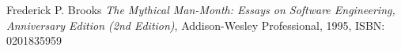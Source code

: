 Frederick P. Brooks {\em The Mythical Man-Month: Essays on Software
                  Engineering, Anniversary Edition (2nd Edition)},
  {Addison-Wesley Professional}, 1995,
  ISBN:  0201835959\\\\



